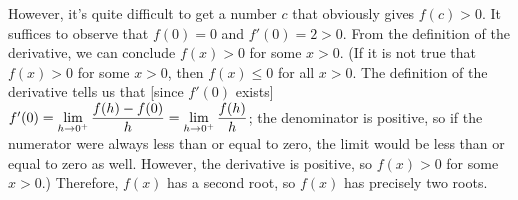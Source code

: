 \begin{solution}
\begin{itemize}
However, it's quite difficult to get a number $c$ that obviously gives $f(c)>0$.
It suffices to observe that $f(0)=0$ and $f'(0)=2>0$. From the definition of the derivative, we can conclude $f(x)>0$ for some $x>0$. (If it is not true that $f(x)>0$ for some $x>0$, then $f(x)\le 0$
      for all $x>0$. The definition of the derivative tells us that [since $f'(0)$ exists]
 $f'(0)=\displaystyle\lim_{h \to 0^+}\frac{f(h)-f(0)}{h}=\displaystyle\lim_{h \to 0^+}\frac{f(h)}{h}$; the denominator is positive, so if the numerator were always less than or equal to zero, the limit would be less than or equal to zero as well. However, the derivative is positive, so $f(x)>0$ for some $x>0$.)
Therefore, $f(x)$ has a second root, so $f(x)$ has precisely two roots.
\end{itemize}
\end{solution}







